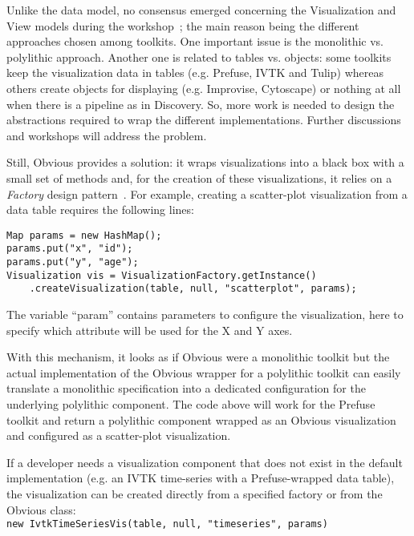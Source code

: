 \label{sec:viewvis}
Unlike the data model, no consensus emerged concerning the
Visualization and View models during the
workshop~\cite{vismaster2008}; the main reason being the different
approaches chosen among toolkits.  One important issue is the
monolithic vs. polylithic approach. Another one is related to tables
vs. objects: some toolkits keep the visualization data in tables
(e.g. Prefuse, IVTK and Tulip) whereas others create
objects for displaying (e.g. Improvise, Cytoscape) or nothing at all
when there is a pipeline as in Discovery.  So, more work is needed to
design the abstractions required to wrap the different
implementations.  Further discussions and workshops will address the
problem.

Still, Obvious provides a solution: it wraps visualizations into a
black box with a small set of methods and, for the creation of these
visualizations, it relies on a \emph{Factory} design
pattern~\cite{DesignPatterns}.  For example, creating a scatter-plot
visualization from a data table requires the following lines:
\begin{lstlisting}
Map params = new HashMap();
params.put("x", "id");
params.put("y", "age");
Visualization vis = VisualizationFactory.getInstance()
    .createVisualization(table, null, "scatterplot", params);
\end{lstlisting}
The variable ``param'' contains parameters to configure the
visualization, here to specify which attribute will be used for the X
and Y axes.

With this mechanism, it looks as if Obvious were a monolithic toolkit
but the actual implementation of the Obvious wrapper for a polylithic
toolkit can easily translate a monolithic specification into a
dedicated configuration for the underlying polylithic component.  The
code above will work for the Prefuse toolkit and return a polylithic
component wrapped as an Obvious visualization and configured as a
scatter-plot visualization.

If a developer needs a visualization component that does not exist in
the default implementation (e.g. an IVTK time-series with a
Prefuse-wrapped data table), the visualization can be created directly
from a specified factory or from the Obvious class:\\
\lstinline!new IvtkTimeSeriesVis(table, null, "timeseries", params)!

